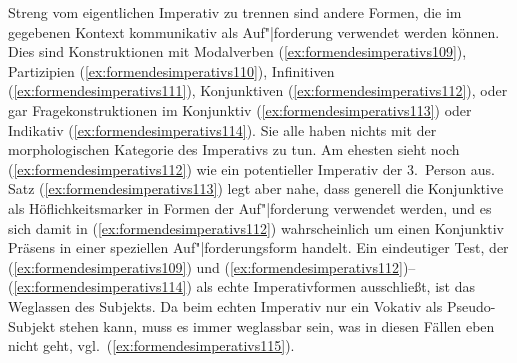 Streng vom eigentlichen Imperativ zu trennen sind andere Formen, die im gegebenen Kontext kommunikativ als Auf"|forderung verwendet werden können.
Dies sind \zB Konstruktionen mit Modalverben (\ref{ex:formendesimperativs109}), Partizipien (\ref{ex:formendesimperativs110}), Infinitiven (\ref{ex:formendesimperativs111}), Konjunktiven (\ref{ex:formendesimperativs112}), oder gar Fragekonstruktionen im Konjunktiv (\ref{ex:formendesimperativs113}) oder Indikativ (\ref{ex:formendesimperativs114}).
Sie alle haben nichts mit der morphologischen Kategorie des Imperativs zu tun.
Am ehesten sieht noch (\ref{ex:formendesimperativs112}) wie ein potentieller Imperativ der 3.~Person aus.
Satz (\ref{ex:formendesimperativs113}) legt aber nahe, dass generell die Konjunktive als Höflichkeitsmarker in Formen der Auf"|forderung verwendet werden, und es sich damit in (\ref{ex:formendesimperativs112}) wahrscheinlich um einen Konjunktiv Präsens in einer speziellen Auf"|forderungsform handelt.
Ein eindeutiger Test, der (\ref{ex:formendesimperativs109}) und (\ref{ex:formendesimperativs112})--(\ref{ex:formendesimperativs114}) als echte Imperativformen ausschließt, ist das Weglassen des Subjekts.
Da beim echten Imperativ nur ein Vokativ als Pseudo-Subjekt stehen kann, muss es immer weglassbar sein, was in diesen Fällen eben nicht geht, vgl.\ (\ref{ex:formendesimperativs115}).

\begin{exe}
  \ex\label{ex:formendesimperativs108}
    \begin{xlist}
    \end{xlist}

  \ex\label{ex:formendesimperativs115}
    \begin{xlist}
    \end{xlist}
\end{exe}

